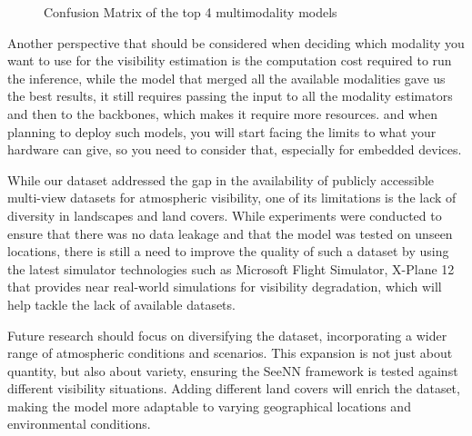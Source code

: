 \begin{figure}
    \centering
    \begin{subfigure}[b]{0.4\textwidth}
    
    
    \end{subfigure}
    \begin{subfigure}[b]{0.4\textwidth}
        
    \end{subfigure}
    \begin{subfigure}[b]{0.4\textwidth}
            
    \end{subfigure}
    \begin{subfigure}[b]{0.4\textwidth}
            
    \end{subfigure}
    \caption{Confusion Matrix of the top 4 multimodality models}
    \label{fig:conf_mats}
\end{figure}


Another perspective that should be considered when deciding which modality you want to use for the visibility estimation is the computation cost required to run the inference, while the model that merged all the available modalities gave us the best results, it still requires passing the input to all the modality estimators and then to the backbones, which makes it require more resources. and when planning to deploy such models, you will start facing the limits to what your hardware can give, so you need to consider that, especially for embedded devices.

While our dataset addressed the gap in the availability of publicly accessible multi-view datasets for atmospheric visibility, one of its limitations is the lack of diversity in landscapes and land covers. While experiments were conducted to ensure that there was no data leakage and that the model was tested on unseen locations, there is still a need to improve the quality of such a dataset by using the latest simulator technologies such as Microsoft Flight Simulator, X-Plane 12 that provides near real-world simulations for visibility degradation, which will help tackle the lack of available datasets.

Future research should focus on diversifying the dataset, incorporating a wider range of atmospheric conditions and scenarios. This expansion is not just about quantity, but also about variety, ensuring the SeeNN framework is tested against different visibility situations. Adding different land covers will enrich the dataset, making the model more adaptable to varying geographical locations and environmental conditions.

